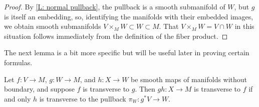 \begin{proof}
	By \cref{L: normal pullback}, the pullback is a smooth submanifold of $W$, but $g$ is itself an embedding, so, identifying the manifolds with their embedded images, we obtain smooth submanifolds $V\times_MW\subset W\subset M$.
	That $V\times_MW=V\cap W$ in this situation follows immediately from the definition of the fiber product.
\end{proof}

The next lemma is a bit more specific but will be useful later in proving certain formulas.

\begin{lemma}\label{L: transverse to pullback}
	Let $f \colon V\to M$, $g \colon W\to M$, and $h \colon X\to W$ be smooth maps of manifolds without boundary, and suppose $f$ is transverse to $g$.
	Then $gh \colon X\to M$ is transverse to $f$ if and only $h$ is transverse to the pullback $\pi_W \colon g^*V\to W$.
\end{lemma}

